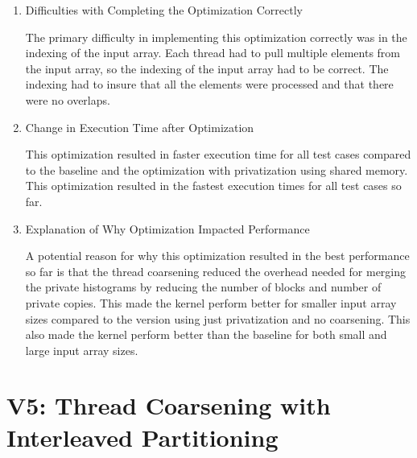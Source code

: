 \documentclass{article}
\begin{document}
\begin{enumerate}
	\item Difficulties with Completing the Optimization Correctly
	
	The primary difficulty in implementing this optimization correctly was in the indexing of the input array. Each thread had to pull multiple elements from the input array, so the indexing of the input array had to be correct. The indexing had to insure that all the elements were processed and that there were no overlaps. 
	
	\item Change in Execution Time after Optimization
	
	This optimization resulted in faster execution time for all test cases compared to the baseline and the optimization with privatization using shared memory. This optimization resulted in the fastest execution times for all test cases so far. 
	
	\item Explanation of Why Optimization Impacted Performance
	
	A potential reason for why this optimization resulted in the best performance so far is that the thread coarsening reduced the overhead needed for merging the private histograms by reducing the number of blocks and number of private copies. This made the kernel perform better for smaller input array sizes compared to the version using just privatization and no coarsening. This also made the kernel perform better than the baseline for both small and large input array sizes. 
	
\end{enumerate}

\section{V5: Thread Coarsening with Interleaved Partitioning}
\end{document}
